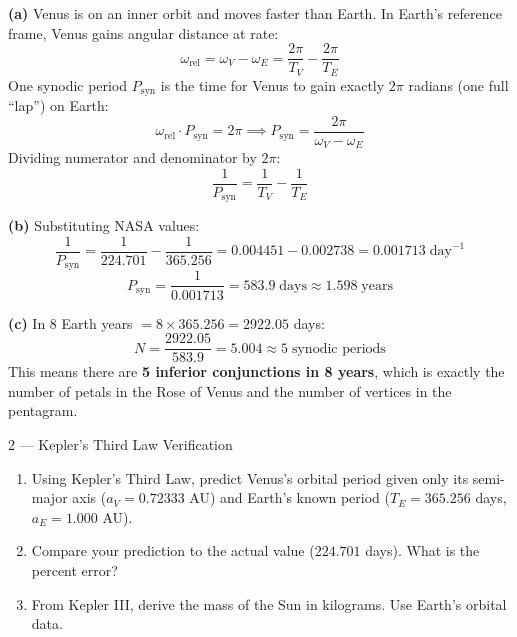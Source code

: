 \documentclass[11pt,letterpaper]{article}
\begin{document}
\begin{solution}
\textbf{(a)} Venus is on an inner orbit and moves faster than Earth.
In Earth's reference frame, Venus gains angular distance at rate:
\[
  \omega_{\text{rel}} = \omega_V - \omega_E
  = \frac{2\pi}{T_V} - \frac{2\pi}{T_E}
\]
One synodic period $P_\text{syn}$ is the time for Venus to gain
exactly $2\pi$ radians (one full ``lap'') on Earth:
\[
  \omega_{\text{rel}} \cdot P_\text{syn} = 2\pi
  \implies P_\text{syn} = \frac{2\pi}{\omega_V - \omega_E}
\]
Dividing numerator and denominator by $2\pi$:
\[
  \boxed{\frac{1}{P_\text{syn}} = \frac{1}{T_V} - \frac{1}{T_E}}
\]

\textbf{(b)} Substituting NASA values:
\[
  \frac{1}{P_\text{syn}}
  = \frac{1}{224.701} - \frac{1}{365.256}
  = 0.004451 - 0.002738
  = 0.001713\;\text{day}^{-1}
\]
\[
  P_\text{syn} = \frac{1}{0.001713} = \boxed{583.9\;\text{days}
  \approx 1.598\;\text{years}}
\]

\textbf{(c)} In 8 Earth years $= 8 \times 365.256 = 2922.05$ days:
\[
  N = \frac{2922.05}{583.9} = 5.004
  \approx \boxed{5\;\text{synodic periods}}
\]
This means there are \textbf{5 inferior conjunctions in 8 years},
which is exactly the number of petals in the Rose of Venus and the
number of vertices in the pentagram.
\end{solution}

\newpage

\begin{problem}{2 — Kepler's Third Law Verification}
\begin{enumerate}[label=(\alph*)]
  \item Using Kepler's Third Law, predict Venus's orbital period
    given only its semi-major axis ($a_V = 0.72333$ AU) and Earth's
    known period ($T_E = 365.256$ days, $a_E = 1.000$ AU).
  \item Compare your prediction to the actual value ($224.701$ days).
    What is the percent error?
  \item From Kepler III, derive the mass of the Sun in kilograms.
    Use Earth's orbital data.
\end{enumerate}
\end{problem}
\end{document}
